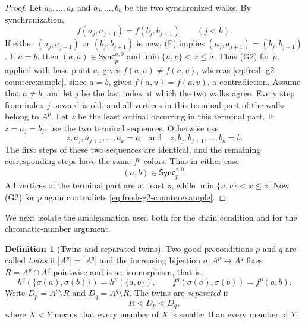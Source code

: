 \documentclass[10pt,a4paper]{amsart}
\numberwithin{equation}{section}
\theoremstyle{definition}
\newtheorem{definition}[theorem]{Definition}
\theoremstyle{remark}
\begin{document}
\begin{proof}
Let $a_0,\ldots,a_k$ and $b_0,\ldots,b_k$ be the two synchronized
walks.  By synchronization,
\begin{displaymath}
 f(a_j,a_{j+1})=f(b_j,b_{j+1})\qquad(j<k).
\end{displaymath}
If either $(a_j,a_{j+1})$ or $(b_j,b_{j+1})$ is new, (F) implies
$(a_j,a_{j+1})=(b_j,b_{j+1})$.  If $a=b$, then
$(a,a)\in\mathsf{Sync}^{a,0}_p$ and
$\min\{u,v\}<x\leq a$.  Thus (G2) for $p$, applied with base point
$a$, gives $f(a,u)\ne f(a,v)$, whereas
\eqref{eq:fresh-g2-counterexample}, since $a=b$, gives
$f(a,u)=f(a,v)$, a contradiction.
Assume that $a\ne b$, and let $j$ be the last index at which the two
walks agree.  Every step from index $j$ onward is old, and all vertices
in this terminal part of the walks belong to $A^p$.  Let $z$ be the
least ordinal occurring in this terminal part.  If $z=a_j=b_j$, use
the two terminal sequences.  Otherwise use
\begin{displaymath}
 z,a_j,a_{j+1},\ldots,a_k=a
 \quad\text{and}\quad
 z,b_j,b_{j+1},\ldots,b_k=b.
\end{displaymath}
The first steps of these two sequences are identical, and the remaining
corresponding steps have the same $f^p$-colors.  Thus in either case
\begin{displaymath}
 (a,b)\in\mathsf{Sync}^{z,0}_p.
\end{displaymath}
All vertices of the terminal part are at least $z$, while
$\min\{u,v\}<x\leq z$.  Now (G2) for $p$ again contradicts
\eqref{eq:fresh-g2-counterexample}.
\end{proof}


We next isolate the amalgamation used both for the chain condition and
for the chromatic-number argument.

\begin{definition}[Twins and separated twins]\label{def:twins}
Two good preconditions $p$ and $q$
are called \emph{twins} if $|A^p|=|A^q|$ and the increasing bijection
$\sigma:A^p\to A^q$ fixes $R=A^p\cap A^q$ pointwise and is an
isomorphism, that is,
\begin{displaymath}
 h^q(\{\sigma(a),\sigma(b)\})=h^p(\{a,b\}),
 \qquad
 f^q(\sigma(a),\sigma(b))=f^p(a,b).
\end{displaymath}
Write $D_p=A^p\setminus R$ and $D_q=A^q\setminus R$.
The twins are \emph{separated} if
\begin{displaymath}
 R<D_p<D_q,
\end{displaymath}
where $X<Y$ means that every member of $X$ is smaller than every
member of $Y$.
\end{definition}
\end{document}
